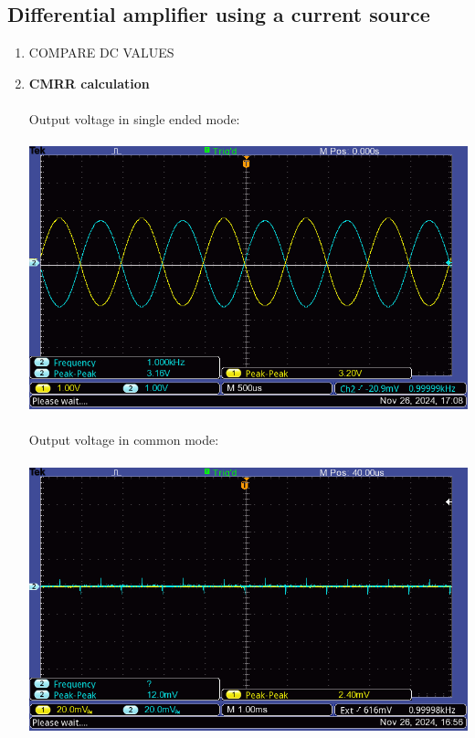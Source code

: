 \documentclass{article}
\begin{document}
	\subsection{Differential amplifier using a current source}
	\begin{enumerate}
		\item COMPARE DC VALUES
		\item \textbf{CMRR calculation}\\\\
		Output voltage in single ended mode:\\\\
		\includegraphics[scale=0.5]{7.3.3.2 Current source diff Collector Vs single/F0003TEK}\\\\
		Output voltage in common mode:\\\\
		\includegraphics[scale=0.5]{7.3.3.3 Current source diff Collector Vs common/F0002TEK}\\\\

\end{enumerate}
\end{document}
